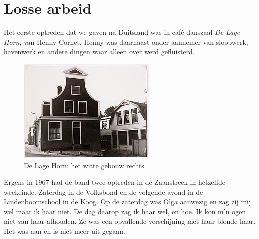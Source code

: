\documentclass[10pt,twoside, openright]{memoir}
\begin{document}
\chapter{Losse arbeid} %
\label{cha:lossearbeid}

Het eerste optreden dat we gaven na Duitsland was in café-danszaal \emph{De Lage Horn}, van Henny Cornet. Henny was daarnaast onder-aannemer van sloopwerk, havenwerk en andere dingen waar alleen over werd gefluisterd. 

\begin{figure}
\includegraphics[width=\textwidth]{img/ch38/image}
\caption*{\footnotesize De Lage Horn: het witte gebouw rechts}
\end{figure}

Ergens in 1967 had de band twee optreden in de Zaanstreek in hetzelfde weekeinde. Zaterdag in de Volksbond en de volgende avond in de Lindenboomschool in de Koog. Op de zaterdag was Olga aanwezig en zag zij mij wel maar ik haar niet. De dag daarop zag ik haar wel, en hoe. Ik kon m'n ogen niet van haar afhouden. Ze was een opvallende verschijning met haar blonde haar. Het was aan en is niet meer uit gegaan.
\end{document}
